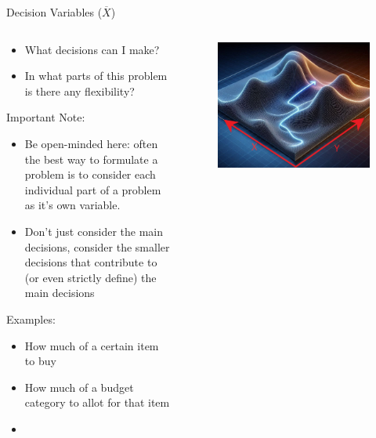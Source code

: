 \documentclass[10pt, aspectratio=169]{beamer}
\begin{document}
\begin{frame}{Decision Variables ($\overline{X}$)}
    \begin{columns}
        \begin{column}{0.5\textwidth}
            \begin{itemize}
                \item What decisions can I make?
                \item In what parts of this problem is there any flexibility?
            \end{itemize}
            Important Note:
            \begin{itemize}
                \item Be open-minded here: often the best way to formulate a problem is to consider each individual part of a problem as it's own variable.
                \item Don't just consider the main decisions, consider the smaller decisions that contribute to (or even strictly define) the main decisions
            \end{itemize}
            Examples:
            \begin{itemize}
                \item How much of a certain item to buy
                \item How much of a budget category to allot for that item
                \item 
            \end{itemize}
        \end{column}
        \begin{column}{0.5\textwidth}
            \begin{figure}
                \includegraphics[width=0.8\linewidth]{MountainWithDecisionVariables.jpeg}
            \end{figure}
        \end{column}
    \end{columns}
\end{frame}
\end{document}
